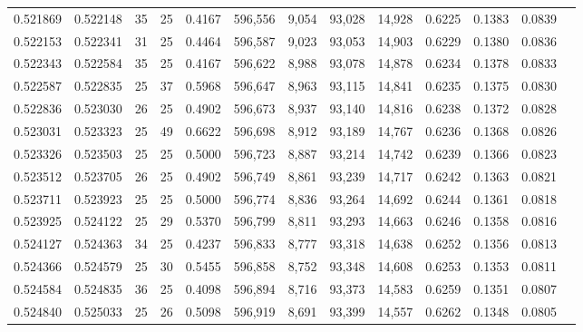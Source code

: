 \begin{tabular}{rrrrrrrrrrrrr}
0.521869 & 0.522148 &    35 &  25 &                                     0.4167 & 596,556 &   9,054 &  93,028 &  14,928 & 0.6225 & 0.1383 & 0.0839 \\
0.522153 & 0.522341 &    31 &  25 &                                     0.4464 & 596,587 &   9,023 &  93,053 &  14,903 & 0.6229 & 0.1380 & 0.0836 \\
0.522343 & 0.522584 &    35 &  25 &                                     0.4167 & 596,622 &   8,988 &  93,078 &  14,878 & 0.6234 & 0.1378 & 0.0833 \\
0.522587 & 0.522835 &    25 &  37 &                                     0.5968 & 596,647 &   8,963 &  93,115 &  14,841 & 0.6235 & 0.1375 & 0.0830 \\
0.522836 & 0.523030 &    26 &  25 &                                     0.4902 & 596,673 &   8,937 &  93,140 &  14,816 & 0.6238 & 0.1372 & 0.0828 \\
0.523031 & 0.523323 &    25 &  49 &                                     0.6622 & 596,698 &   8,912 &  93,189 &  14,767 & 0.6236 & 0.1368 & 0.0826 \\
0.523326 & 0.523503 &    25 &  25 &                                     0.5000 & 596,723 &   8,887 &  93,214 &  14,742 & 0.6239 & 0.1366 & 0.0823 \\
0.523512 & 0.523705 &    26 &  25 &                                     0.4902 & 596,749 &   8,861 &  93,239 &  14,717 & 0.6242 & 0.1363 & 0.0821 \\
0.523711 & 0.523923 &    25 &  25 &                                     0.5000 & 596,774 &   8,836 &  93,264 &  14,692 & 0.6244 & 0.1361 & 0.0818 \\
0.523925 & 0.524122 &    25 &  29 &                                     0.5370 & 596,799 &   8,811 &  93,293 &  14,663 & 0.6246 & 0.1358 & 0.0816 \\
0.524127 & 0.524363 &    34 &  25 &                                     0.4237 & 596,833 &   8,777 &  93,318 &  14,638 & 0.6252 & 0.1356 & 0.0813 \\
0.524366 & 0.524579 &    25 &  30 &                                     0.5455 & 596,858 &   8,752 &  93,348 &  14,608 & 0.6253 & 0.1353 & 0.0811 \\
0.524584 & 0.524835 &    36 &  25 &                                     0.4098 & 596,894 &   8,716 &  93,373 &  14,583 & 0.6259 & 0.1351 & 0.0807 \\
0.524840 & 0.525033 &    25 &  26 &                                     0.5098 & 596,919 &   8,691 &  93,399 &  14,557 & 0.6262 & 0.1348 & 0.0805 \\

\end{tabular}
